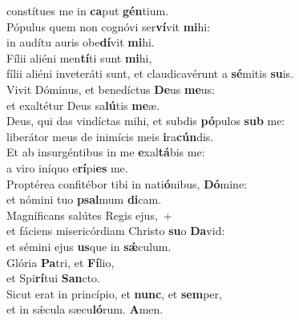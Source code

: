 \oddverse constítues me in \textbf{ca}put \textbf{gén}tium.\\
\evenverse Pópulus quem non cognóvi ser\textbf{ví}vit \textbf{mi}hi:~\*\\
\evenverse in audítu auris obe\textbf{dí}vit \textbf{mi}hi.\\
\oddverse Fílii aliéni men\textbf{tí}ti sunt \textbf{mi}hi,~\*\\
\oddverse fílii aliéni inveteráti sunt, et claudicavérunt a \textbf{sé}mitis \textbf{su}is.\\
\evenverse Vivit Dóminus, et benedíctus \textbf{De}us \textbf{me}us:~\*\\
\evenverse et exaltétur Deus sa\textbf{lú}tis \textbf{me}æ.\\
\oddverse Deus, qui das vindíctas mihi, et subdis \textbf{pó}pulos \textbf{sub} me:~\*\\
\oddverse liberátor meus de inimícis meis \textbf{i}ra\textbf{cún}dis.\\
\evenverse Et ab insurgéntibus in me \textbf{e}xal\textbf{tá}bis me:~\*\\
\evenverse a viro iníquo e\textbf{rí}pi\textbf{es} me.\\
\oddverse Proptérea confitébor tibi in nati\textbf{ó}nibus, \textbf{Dó}mine:~\*\\
\oddverse et nómini tuo \textbf{psal}mum \textbf{di}cam.\\
\evenverse Magníficans salútes Regis ejus,~+\\
\evenverse  et fáciens misericórdiam Christo \textbf{su}o \textbf{Da}vid:~\*\\
\evenverse et sémini ejus \textbf{us}que in \textbf{sǽ}culum.\\
\oddverse Glória \textbf{Pa}tri, et \textbf{Fí}lio,~\*\\
\oddverse et Spi\textbf{rí}tui \textbf{San}cto.\\
\evenverse Sicut erat in princípio, et \textbf{nunc}, et \textbf{sem}per,~\*\\
\evenverse et in sǽcula sæcu\textbf{ló}rum. \textbf{A}men.\\
